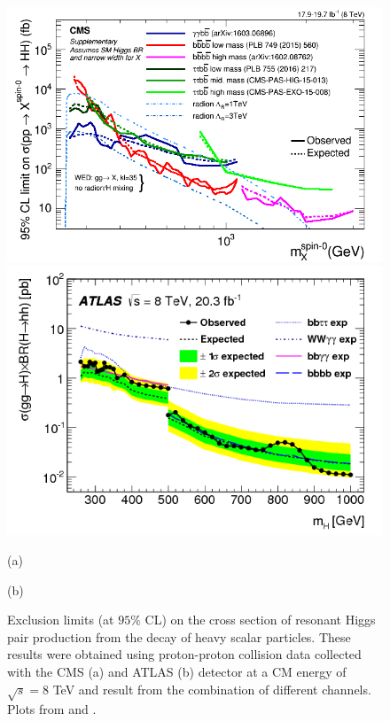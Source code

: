 \begin{figure}
	\centering
	\begin{minipage}{.5\textwidth}
		\centering
		\includegraphics[width=\linewidth]{./Figures/CMS_spin0_exc.png}
	\end{minipage}%
	\begin{minipage}{.5\textwidth}
		\centering
		\includegraphics[width=\linewidth]{./Figures/ATLASmH.png}
	\end{minipage}
	\begin{minipage}[t]{0.5\textwidth}
		\caption*{(a)}
	\end{minipage}%
	\hfill
	\begin{minipage}[t]{0.5\textwidth}
		\caption*{(b)}
	\end{minipage}
	\caption{Exclusion limits (at $95\%$ CL) on the cross section of resonant Higgs pair production from the decay of heavy scalar particles. These results were obtained using proton-proton collision data collected with the CMS (a) and ATLAS (b) detector at a CM energy of $\sqrt{s}=8$ TeV and result from the combination of different channels. Plots from \cite{hhbbAA_CMS} and \cite{ATLAShhBSMcomb}.}
	\label{fig:ATLAS_CMS_BSMlim}
\end{figure}

